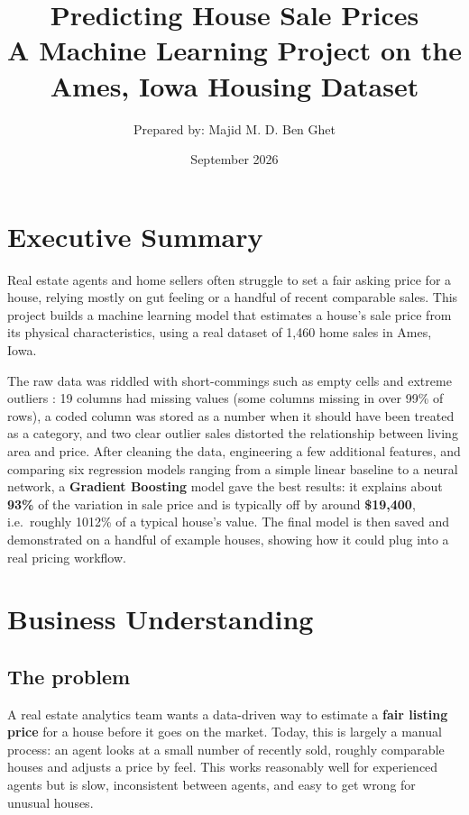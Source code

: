 \documentclass[11pt]{article}
\title{\textbf{Predicting House Sale Prices} \\ \large A Machine Learning Project on the Ames, Iowa Housing Dataset}
\author{Prepared by: Majid M. D. Ben Ghet}
\date{September 2026}
\begin{document}
\maketitle

\tableofcontents
\newpage

\section*{Executive Summary}

Real estate agents and home sellers often struggle to set a fair asking price for a
house, relying mostly on gut feeling or a handful of recent comparable sales. This
project builds a machine learning model that estimates a house's sale price from its
physical characteristics, using a real dataset of 1,460 home sales in Ames, Iowa.

The raw data was riddled with short-commings such as empty cells and extreme outliers : 19 columns had missing values (some columns missing
in over 99\% of rows), a coded column was stored as a number when it should have been
treated as a category, and two clear outlier sales distorted the relationship between
living area and price. After cleaning the data, engineering a few additional
features, and comparing six regression models ranging from a simple linear baseline
to a neural network, a \textbf{Gradient Boosting} model gave the best results: it
explains about \textbf{93\%} of the variation in sale price and is typically off by
around \textbf{\$19,400}, i.e.\ roughly 1012\% of a typical house's value. The final
model is then saved and demonstrated on a handful of example houses, showing how it
could plug into a real pricing workflow.

\section{Business Understanding}

\subsection{The problem}

A real estate analytics team wants a data-driven way to estimate a \textbf{fair
listing price} for a house before it goes on the market. Today, this is largely a
manual process: an agent looks at a small number of recently sold, roughly comparable
houses and adjusts a price by feel. This works reasonably well for experienced agents
but is slow, inconsistent between agents, and easy to get wrong for unusual houses.
\end{document}
